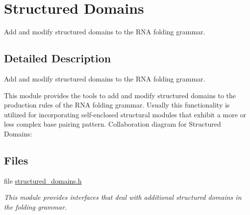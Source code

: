\hypertarget{group__domains__struc}{}\section{Structured Domains}
\label{group__domains__struc}


Add and modify structured domains to the R\+NA folding grammar.  




\subsection{Detailed Description}
Add and modify structured domains to the R\+NA folding grammar. 

This module provides the tools to add and modify structured domains to the production rules of the R\+NA folding grammar. Usually this functionality is utilized for incorporating self-\/enclosed structural modules that exhibit a more or less complex base pairing pattern. Collaboration diagram for Structured Domains\+:
\subsection*{Files}
\begin{DoxyCompactItemize}
\item 
file \mbox{\hyperlink{structured__domains_8h}{structured\+\_\+domains.\+h}}
\begin{DoxyCompactList}\small\item\em This module provides interfaces that deal with additional structured domains in the folding grammar. \end{DoxyCompactList}\end{DoxyCompactItemize}
